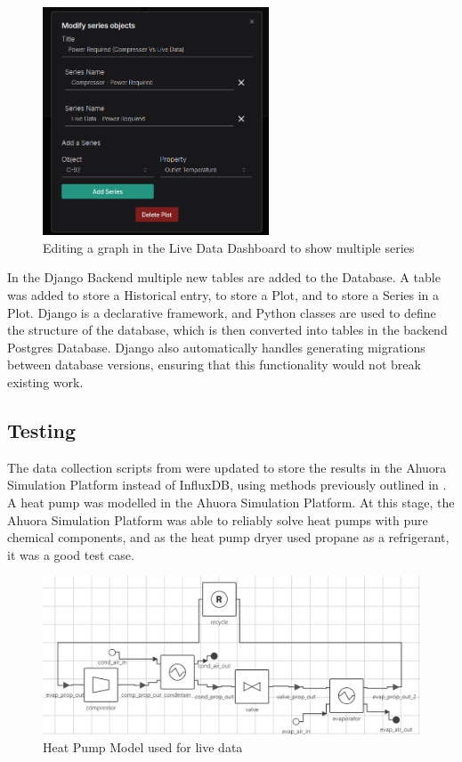 \begin{figure}[h]
    \centering
    \includegraphics[width=0.6\textwidth]{series_editor.png}
    \caption{Editing a graph in the Live Data Dashboard to show multiple series}
    \label{fig:series_editor}
\end{figure}

In the Django Backend multiple new tables are added to the Database. A table was added to store a Historical entry, to store a Plot, and to store a Series in a Plot. Django is a declarative framework, and Python classes are used to define the structure of the database, which is then converted into tables in the backend Postgres Database. Django also automatically handles generating migrations between database versions, ensuring that this functionality would not break existing work.


\subsection{Testing}

The data collection scripts from  were updated to store the results in the Ahuora Simulation Platform instead of InfluxDB, using methods previously outlined in . A heat pump was modelled in the Ahuora Simulation Platform. At this stage, the Ahuora Simulation Platform was able to reliably solve heat pumps with pure chemical components, and as the heat pump dryer used propane as a refrigerant, it was a good test case. 


\begin{figure}
    \centering
    \includegraphics[width=\textwidth]{heatpumpmodel.png}
    \caption{Heat Pump Model used for live data}
    \label{fig:heatpumpmodel}
\end{figure}

